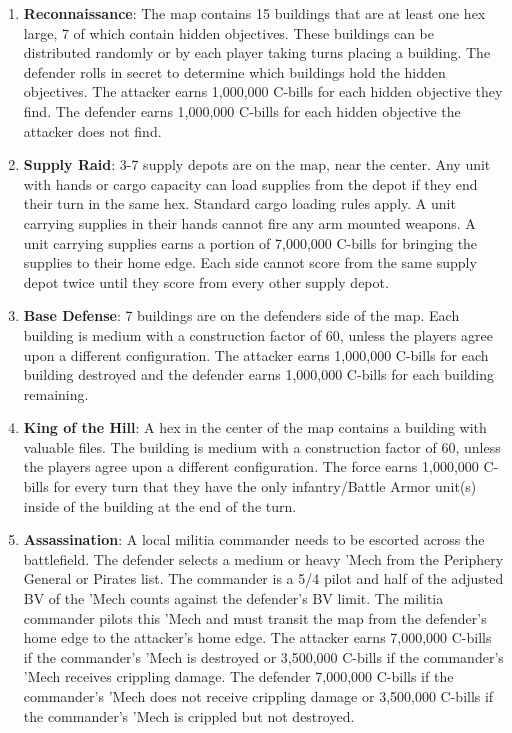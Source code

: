 \documentclass{article}
\begin{document}
\begin{enumerate}

\item {\bfseries Reconnaissance}: The map contains 15 buildings that are at least one hex large, 7 of which contain hidden objectives.
These buildings can be distributed randomly or by each player taking turns placing a building.
The defender rolls in secret to determine which buildings hold the hidden objectives.
The attacker earns 1,000,000 C-bills for each hidden objective they find.
The defender earns 1,000,000 C-bills for each hidden objective the attacker does not find.

\item {\bfseries Supply Raid}: 3-7 supply depots are on the map, near the center.
Any unit with hands or cargo capacity can load supplies from the depot if they end their turn in the same hex.
Standard cargo loading rules apply.
A unit carrying supplies in their hands cannot fire any arm mounted weapons.
A unit carrying supplies earns a portion of 7,000,000 C-bills for bringing the supplies to their home edge.
Each side cannot score from the same supply depot twice until they score from every other supply depot.

\item {\bfseries Base Defense}: 7 buildings are on the defenders side of the map.
Each building is medium with a construction factor of 60, unless the players agree upon a different configuration.
The attacker earns 1,000,000 C-bills for each building destroyed and the defender earns 1,000,000 C-bills for each building remaining.

\item {\bfseries King of the Hill}: A hex in the center of the map contains a building with valuable files.
The building is medium with a construction factor of 60, unless the players agree upon a different configuration.
The force earns 1,000,000 C-bills for every turn that they have the only infantry/Battle Armor unit(s) inside of the building at the end of the turn.

\item {\bfseries Assassination}: A local militia commander needs to be escorted across the battlefield.
The defender selects a medium or heavy 'Mech from the Periphery General or Pirates list.
The commander is a 5/4 pilot and half of the adjusted BV of the 'Mech counts against the defender's BV limit.
The militia commander pilots this 'Mech and must transit the map from the defender's home edge to the attacker's home edge.
The attacker earns 7,000,000 C-bills if the commander's 'Mech is destroyed or 3,500,000 C-bills if the commander's 'Mech receives crippling damage.
The defender 7,000,000 C-bills if the commander's 'Mech does not receive crippling damage  or 3,500,000 C-bills if the commander's 'Mech is crippled but not destroyed.


\end{enumerate}
\end{document}
